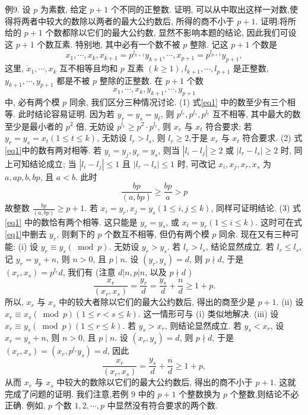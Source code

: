 例9. 设 $p$ 为素数, 给定 $p+1$ 个不同的正整数.
证明, 可以从中取出这样一对数,使得将两者中较大的数除以两者的最大公约数后, 所得的商不小于 $p+1$.
证明:将所给的 $p+1$ 个数都除以它们的最大公约数, 显然不影响本题的结论, 因此我们可设这 $p+1$ 个数互素.
特别地, 其中必有一个数不被 $p$ 整除.
记这 $p+1$ 个数是
$$
x_1, \cdots, x_k, x_{k+1}=p^{l_{k+1}} y_{k+1}, \cdots, x_{p+1}=p^{l_{p+1}} y_{p+1}, \label{eq1}
$$
这里, $\dot{x}_1, \cdots, x_k$ 互不相等且均和 $p$ 互素 $(k \geqslant 1), l_{k+1}, \cdots, l_{p+1}$ 是正整数, $y_{k+1}, \cdots, y_{p+1}$ 都是不被 $p$ 整除的正整数.
在 $p+1$ 个数
$$
x_1, \cdots, x_k, y_{k+1}, \cdots, y_{p+1}
$$
中, 必有两个模 $p$ 同余, 我们区分三种情况讨论.
(1) 式\ref{eq1} 中的数至少有三个相等.
此时结论容易证明.
因为若 $y_r=y_s=y_t$,
则 $p^{l_r}, p^{l_s}, p^{l_t}$ 互不相等, 其中最大的数至少是最小者的 $p^2$ 倍, 无妨设 $p^{l_r} \geqslant p^2 \cdot p^{l_t}$, 则 $x_r$ 与 $x_t$ 符合要求; 若 $y_r=y_s=x_t(1 \leqslant t \leqslant k)$, 无妨设 $l_r>l_s$, 则 $l_r \geqslant 2$,于是 $x_r$ 与 $x_t$ 符合要求.
(2) 式\ref{eq1}中的数有两对相等.
若 $y_i=y_j, y_r=y_s$, 则当 $\left|l_i-l_j\right| \geqslant 2$ 或 $\left|l_r-l_s\right| \geqslant 2$ 时, 同上可知结论成立; 当 $\left|l_i-l_j\right| \leqslant 1$ 且 $\left|l_r-l_s\right| \leqslant 1$ 时, 可改记 $x_i, x_j, x_r, x_s$ 为 $a, a p, b, b p$, 且 $a<b$. 此时
$$
\frac{b p}{(a, b p)} \geqslant \frac{b p}{a}>p
$$
故整数 $\frac{b p}{(a, b p)} \geqslant p+1$.
若 $x_i=y_r, x_j=y_s(1 \leqslant i, j \leqslant k)$, 同样可证明结论.
(3) 式\ref{eq1} 中的数恰有两个相等.
这只能是 $y_r=y_s$, 或 $x_i=y_r(1 \leqslant i \leqslant k)$. 这时可在式\ref{eq1}中删去 $y_r$, 则剩下的 $p$ 个数互不相等, 但仍有两个模 $p$ 同余.
现在又有三种可能:
(i) 设 $y_r \equiv y_s(\bmod p)$. 无妨设 $y_r>y_s$. 若 $l_r>l_s$, 结论显然成立.
若 $l_r \leqslant l_s$, 记 $y_r=y_s+n$, 则 $n>0$, 且 $p \mid n$. 设 $\left(y_r, y_s\right)=d$, 则 $p \nmid d$, 于是 $\left(x_r, x_s\right)= p^{l_r} d$, 我们有 (注意 $d|n, p| n$, 以及 $p \nmid d$ )
$$
\frac{x_r}{\left(x_r, x_s\right)}=\frac{y_r}{d}=\frac{y_s}{d}+\frac{n}{d} \geqslant 1+p .
$$
所以, $x_r$ 与 $x_s$ 中的较大者除以它们的最大公约数后, 得出的商至少是 $p+1$.
(ii) 设 $x_r \equiv x_s(\bmod p)(1 \leqslant r<s \leqslant k)$. 这一情形可与 (i) 类似地解决.
(iii) 设 $x_r \equiv y_s(\bmod p)(1 \leqslant r \leqslant k)$. 若 $y_s>x_r$, 则结论显然成立.
若 $y_s< x_r$, 设 $x_r=y_s+n$, 则 $n>0$, 且 $p \mid n$. 设 $\left(x_r, y_s\right)=d$, 则 $p \nmid d$, 于是 $\left(x_r, x_s\right)= \left(x_r, p^{l_s} y_s\right)=d$, 因此
$$
\frac{x_r}{\left(x_r, x_s\right)}=\frac{y_s}{d}+\frac{n}{d} \geqslant 1+p,
$$
从而 $x_r$ 与 $x_s$ 中较大的数除以它们的最大公约数后, 得出的商不小于 $p+1$. 这就完成了问题的证明.
我们注意,若例 9 中的 $p+1$ 个整数换为 $p$ 个整数,则结论不必正确.
例如, $p$ 个数 $1,2, \cdots, p$ 中显然没有符合要求的两个数.



